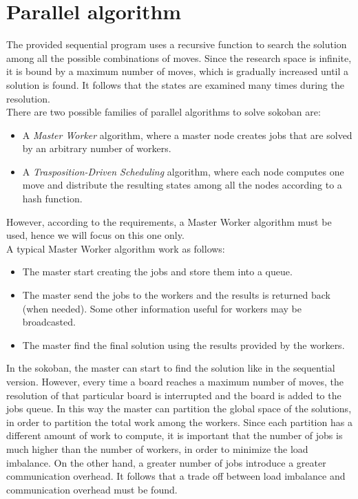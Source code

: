 \documentclass{article}
\begin{document}
\section{Parallel algorithm}
The provided sequential program uses a recursive function to search the solution among all the possible combinations of moves. Since the research space is infinite, it is bound by a maximum number of moves, which is gradually increased until a solution is found. It follows that the states are examined many times during the resolution. \\
There are two possible families of parallel algorithms to solve sokoban are:
\begin{itemize}
    \item A \textit{Master Worker} algorithm, where a master node creates jobs that are solved by an arbitrary number of workers.
    \item A \textit{Trasposition-Driven Scheduling} algorithm, where each node computes one move and distribute the resulting states among all the nodes according to a hash function.
\end{itemize}
However, according to the requirements, a Master Worker algorithm must be used, hence we will focus on this one only. \\
A typical Master Worker algorithm work as follows:
\begin{itemize}
    \item The master start creating the jobs and store them into a queue.
    \item The master send the jobs to the workers and the results is returned back (when needed). Some other information useful for workers may be broadcasted.
    \item The master find the final solution using the results provided by the workers.
\end{itemize}
In the sokoban, the master can start to find the solution like in the sequential version. However, every time a board reaches a maximum number of moves, the resolution of that particular board is interrupted and the board is added to the jobs queue. In this way the master can partition the global space of the solutions, in order to partition the total work among the workers. Since each partition has a different amount of work to compute, it is important that the number of jobs is much higher than the number of workers, in order to minimize the load imbalance. On the other hand, a greater number of jobs introduce a greater communication overhead. It follows that a trade off between load imbalance and communication overhead must be found. \\
\end{document}
